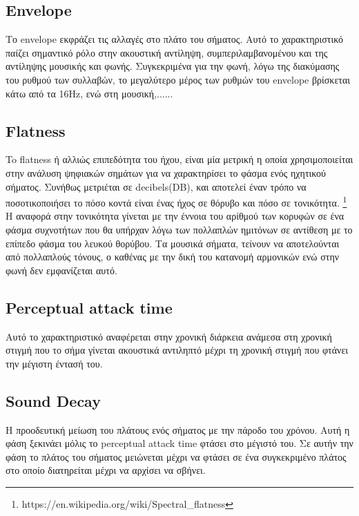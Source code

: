   \subsection{Envelope}

Το envelope εκφράζει τις αλλαγές στο πλάτο του σήματος. Αυτό το χαρακτηριστικό παίζει σημαντικό ρόλο στην ακουστική αντίληψη, συμπεριλαμβανομένου και της αντίληψης μουσικής και φωνής. Συγκεκριμένα για την φωνή, λόγω της διακύμασης του ρυθμού των συλλαβών, το μεγαλύτερο μέρος των ρυθμών του envelope βρίσκεται κάτω από τα 16Hz, ενώ στη μουσική,......


\subsection{Flatness}

To flatness ή αλλιώς επιπεδότητα του ήχου, είναι μία μετρική η οποία χρησιμοποιείται στην ανάλυση ψηφιακών σημάτων για να χαρακτηρίσει το φάσμα ενός ηχητικού σήματος. Συνήθως μετριέται σε decibels(DB), και αποτελεί έναν τρόπο να ποσοτικοποιήσει το πόσο κοντά είναι ένας ήχος σε θόρυβο και πόσο σε τονικότητα.  \footnote{https://en.wikipedia.org/wiki/Spectral\_flatness} Η αναφορά στην τονικότητα γίνεται με την έννοια του αρίθμού των κορυφών σε ένα φάσμα συχνοτήτων που θα υπήρχαν λόγω των πολλαπλών ημιτόνων σε αντίθεση με το επίπεδο φάσμα του λευκού θορύβου. Τα μουσικά σήματα, τείνουν να αποτελούνται από πολλαπλούς τόνους, ο καθένας με την δική του κατανομή αρμονικών ενώ στην φωνή δεν εμφανίζεται αυτό.


\subsection{Perceptual attack time}

Αυτό το χαρακτηριστικό αναφέρεται στην χρονική διάρκεια ανάμεσα στη χρονική στιγμή που το σήμα γίνεται ακουστικά αντιληπτό μέχρι τη χρονική στιγμή που φτάνει την μέγιστη έντασή του. 

\subsection{Sound Decay}

Η προοδευτική μείωση του πλάτους ενός σήματος με την πάροδο του χρόνου. Αυτή η φάση ξεκινάει μόλις το perceptual attack time φτάσει στο μέγιστό του. Σε αυτήν την φάση το πλάτος του σήματος μειώνεται μέχρι να φτάσει σε ένα συγκεκριμένο πλάτος στο οποίο διατηρείται μέχρι να αρχίσει να σβήνει.


